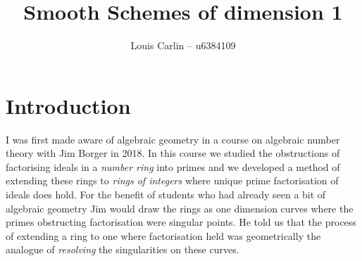 \documentclass{article}
\author{Louis Carlin -- u6384109}
\title{Smooth Schemes of dimension 1}
\theoremstyle{definition}
\begin{document}
\maketitle

\section{Introduction}
I was first made aware of algebraic geometry in a course on algebraic number theory with Jim Borger in 2018.
In this course we studied the obstructions of factorising ideals in a \textit{number ring} into primes and we developed a method of extending these rings to \textit{rings of integers} where unique prime factorisation of ideals does hold.
For the benefit of students who had already seen a bit of algebraic geometry Jim would draw the rings as one dimension curves where the primes obstructing factorisation were singular points.
He told us that the process of extending a ring to one where factorisation held was geometrically the analogue of \textit{resolving} the singularities on these curves.
\end{document}
